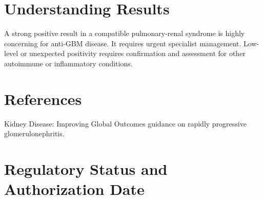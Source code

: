 \section*{Understanding Results}
A strong positive result in a compatible pulmonary-renal syndrome is highly concerning for anti-GBM disease. It requires urgent specialist management. Low-level or unexpected positivity requires confirmation and assessment for other autoimmune or inflammatory conditions.

\section*{References}
Kidney Disease: Improving Global Outcomes guidance on rapidly progressive glomerulonephritis.

\clearpage


\section*{Regulatory Status and Authorization Date}

\clearpage
